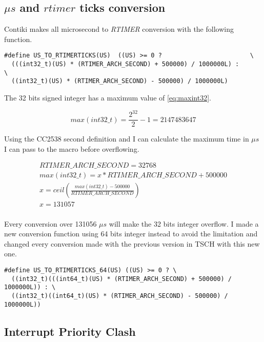 \subsection{$\mu s$ and $rtimer$ ticks conversion}

Contiki makes all microsecond to \emph{RTIMER} conversion with the following
function.

\begin{lstlisting}
#define US_TO_RTIMERTICKS(US)  ((US) >= 0 ?                        \
  (((int32_t)(US) * (RTIMER_ARCH_SECOND) + 500000) / 1000000L) :      \
  ((int32_t)(US) * (RTIMER_ARCH_SECOND) - 500000) / 1000000L)
\end{lstlisting}

The 32 bits signed integer has a maximum value of \ref{eq:maxint32}.

\begin{equation}
  \label{eq:maxint32}
  max(int32\_t) = \frac{2^{32}}{2} - 1 = 2147483647
\end{equation}

Using the CC2538 second definition and I can calculate the maximum time in $\mu s$
I can pass to the macro before overflowing.

\begin{equation}
  \label{eq:maxus}
  \begin{multlined}
  RTIMER\_ARCH\_SECOND = 32768 \\
  max(int32\_t) = x * RTIMER\_ARCH\_SECOND + 500000 \\
  x = ceil(\frac{max(int32\_t) - 500000}{RTIMER\_ARCH\_SECOND}) \\
  x = 131057 \\
  \end{multlined}
\end{equation}

Every conversion over 131056 $\mu s$ will make the 32 bits integer overflow.
I made a new conversion function using 64 bits integer instead to avoid the
limitation and changed every conversion made with the previous version in TSCH
with this new one.

\begin{lstlisting}
#define US_TO_RTIMERTICKS_64(US) ((US) >= 0 ? \
  ((int32_t)(((int64_t)(US) * (RTIMER_ARCH_SECOND) + 500000) / 1000000L)) : \
  ((int32_t)((int64_t)(US) * (RTIMER_ARCH_SECOND) - 500000) / 1000000L)) 
\end{lstlisting}

\subsection{Interrupt Priority Clash}

